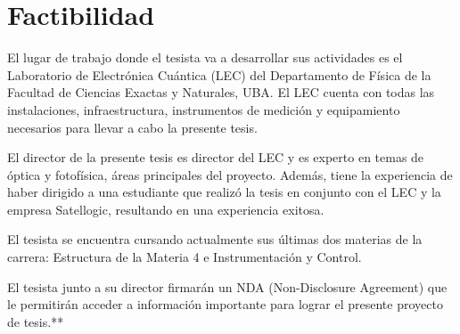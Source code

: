 \documentclass{ctuthesis}
\begin{document}



\section*{Factibilidad}

\hspace{0.5cm}El lugar de trabajo donde el tesista va a desarrollar sus 
actividades es el 
Laboratorio de Electrónica Cuántica (LEC) del Departamento de Física de la 
Facultad de Ciencias Exactas y Naturales, UBA. El LEC cuenta con todas las 
instalaciones, infraestructura, instrumentos de medición y equipamiento 
necesarios para llevar a cabo la presente tesis. 

El director de la presente tesis es director del LEC y es experto en temas de 
óptica y fotofísica, áreas principales del proyecto. Además, tiene la 
experiencia de haber dirigido a una estudiante que realizó la tesis en conjunto 
con el LEC y la empresa Satellogic, resultando en una experiencia exitosa.

El tesista se encuentra cursando actualmente sus últimas dos materias de la 
carrera: 
Estructura de la Materia 4 e Instrumentación y Control.

El tesista junto a su director firmarán un NDA (Non-Disclosure Agreement) que 
le permitirán acceder a información importante para lograr el presente proyecto 
de tesis.**
\end{document}
